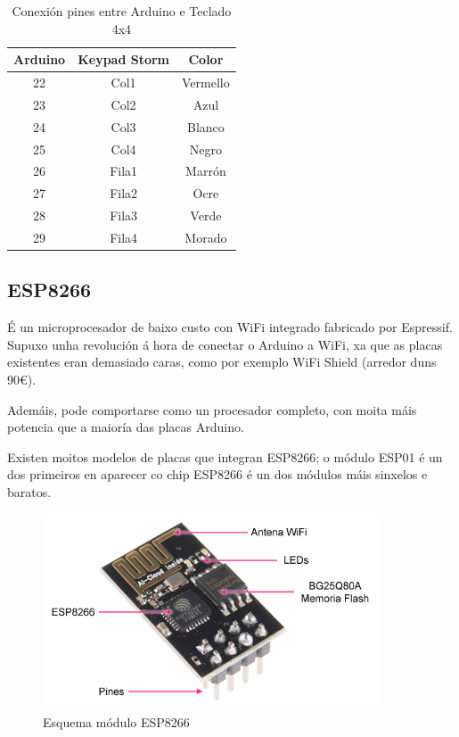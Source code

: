 \documentclass[11pt,twoside]{book}
\begin{document}
\begin{table}[H]
\begin{center}
\begin{tabular}{|c|c|c|}
\hline
Arduino & Keypad Storm & Color \\
\hline
22 & Col1 & Vermello \\
\hline
23 & Col2 & Azul\\
\hline
24 & Col3 & Blanco \\
\hline
25 & Col4 & Negro \\
\hline
26 & Fila1 & Marrón \\
\hline
27 & Fila2 & Ocre\\
\hline
28 & Fila3 & Verde \\
\hline
29 & Fila4 & Morado \\
\hline
\end{tabular}
\caption{Conexión pines entre Arduino e Teclado 4x4}
\label{TablaArduinoKeypad}
\end{center}
\end{table}

\subsection{ESP8266}

É un microprocesador de baixo custo con WiFi integrado fabricado por Espressif. Supuxo unha revolución á hora de conectar o Arduino a WiFi, xa que as placas existentes eran demasiado caras, como por exemplo WiFi Shield (arredor duns 90€).

Ademáis, pode comportarse como un procesador completo, con moita máis potencia que a maioría das placas Arduino.

Existen moitos modelos de placas que integran ESP8266; o módulo ESP01 é un dos primeiros en aparecer co chip ESP8266 é un dos módulos máis sinxelos e baratos. \cite{ESP2}

\begin{figure}[H]
	\begin{center}
		\includegraphics[width=10cm]{images/esp8266_conexion.jpg}
	\end{center}
	\caption{Esquema módulo ESP8266}
	\label{fig:EsquemaESP8266}
\end{figure}
\end{document}
